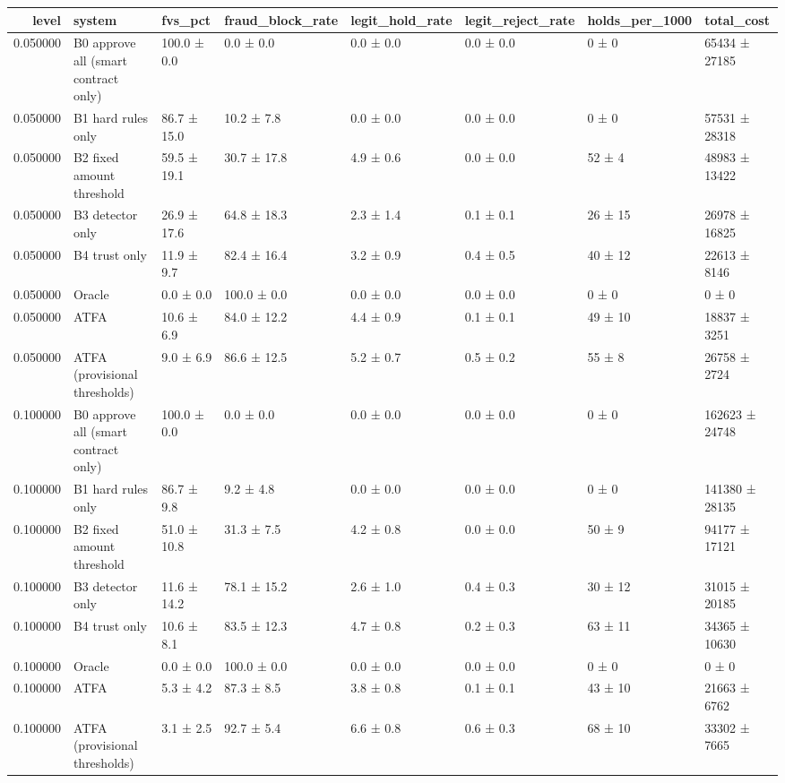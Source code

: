 \begin{tabular}{rlllllll}
\toprule
level & system & fvs\_pct & fraud\_block\_rate & legit\_hold\_rate & legit\_reject\_rate & holds\_per\_1000 & total\_cost \\
\midrule
0.050000 & B0 approve all (smart contract only) & 100.0 ± 0.0 & 0.0 ± 0.0 & 0.0 ± 0.0 & 0.0 ± 0.0 & 0 ± 0 & 65434 ± 27185 \\
0.050000 & B1 hard rules only & 86.7 ± 15.0 & 10.2 ± 7.8 & 0.0 ± 0.0 & 0.0 ± 0.0 & 0 ± 0 & 57531 ± 28318 \\
0.050000 & B2 fixed amount threshold & 59.5 ± 19.1 & 30.7 ± 17.8 & 4.9 ± 0.6 & 0.0 ± 0.0 & 52 ± 4 & 48983 ± 13422 \\
0.050000 & B3 detector only & 26.9 ± 17.6 & 64.8 ± 18.3 & 2.3 ± 1.4 & 0.1 ± 0.1 & 26 ± 15 & 26978 ± 16825 \\
0.050000 & B4 trust only & 11.9 ± 9.7 & 82.4 ± 16.4 & 3.2 ± 0.9 & 0.4 ± 0.5 & 40 ± 12 & 22613 ± 8146 \\
0.050000 & Oracle & 0.0 ± 0.0 & 100.0 ± 0.0 & 0.0 ± 0.0 & 0.0 ± 0.0 & 0 ± 0 & 0 ± 0 \\
0.050000 & ATFA & 10.6 ± 6.9 & 84.0 ± 12.2 & 4.4 ± 0.9 & 0.1 ± 0.1 & 49 ± 10 & 18837 ± 3251 \\
0.050000 & ATFA (provisional thresholds) & 9.0 ± 6.9 & 86.6 ± 12.5 & 5.2 ± 0.7 & 0.5 ± 0.2 & 55 ± 8 & 26758 ± 2724 \\
0.100000 & B0 approve all (smart contract only) & 100.0 ± 0.0 & 0.0 ± 0.0 & 0.0 ± 0.0 & 0.0 ± 0.0 & 0 ± 0 & 162623 ± 24748 \\
0.100000 & B1 hard rules only & 86.7 ± 9.8 & 9.2 ± 4.8 & 0.0 ± 0.0 & 0.0 ± 0.0 & 0 ± 0 & 141380 ± 28135 \\
0.100000 & B2 fixed amount threshold & 51.0 ± 10.8 & 31.3 ± 7.5 & 4.2 ± 0.8 & 0.0 ± 0.0 & 50 ± 9 & 94177 ± 17121 \\
0.100000 & B3 detector only & 11.6 ± 14.2 & 78.1 ± 15.2 & 2.6 ± 1.0 & 0.4 ± 0.3 & 30 ± 12 & 31015 ± 20185 \\
0.100000 & B4 trust only & 10.6 ± 8.1 & 83.5 ± 12.3 & 4.7 ± 0.8 & 0.2 ± 0.3 & 63 ± 11 & 34365 ± 10630 \\
0.100000 & Oracle & 0.0 ± 0.0 & 100.0 ± 0.0 & 0.0 ± 0.0 & 0.0 ± 0.0 & 0 ± 0 & 0 ± 0 \\
0.100000 & ATFA & 5.3 ± 4.2 & 87.3 ± 8.5 & 3.8 ± 0.8 & 0.1 ± 0.1 & 43 ± 10 & 21663 ± 6762 \\
0.100000 & ATFA (provisional thresholds) & 3.1 ± 2.5 & 92.7 ± 5.4 & 6.6 ± 0.8 & 0.6 ± 0.3 & 68 ± 10 & 33302 ± 7665 \\

\end{tabular}
